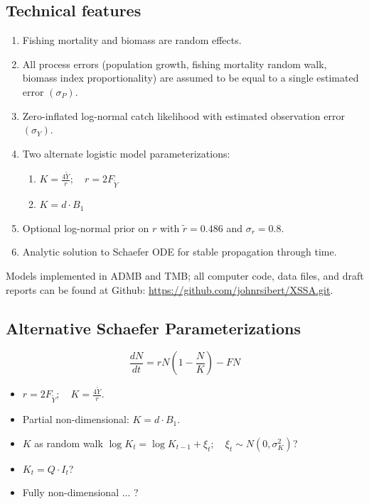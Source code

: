 \documentclass[letterpaper,KOMA,landscape,titlepage]{powersem}
\newcommand\MSY{\widetilde{Y}}
\newcommand\Fmsy{F_{\MSY}}
\begin{document}
\begin{slide}\section{Technical features}
\begin{enumerate}
\item Fishing mortality and biomass are random effects.
\item All process errors (population growth, fishing
mortality random walk, biomass index proportionality) are assumed
to be equal to a single estimated error $(\sigma_P)$.
\item Zero-inflated log-normal catch likelihood with estimated
observation error $(\sigma_Y)$.
\item Two alternate logistic model parameterizations:
\begin{enumerate}
\item $K = \frac{4\MSY}{r};\quad r = 2\Fmsy$
\item $K = d\cdot B_1$
\end{enumerate}
\item Optional log-normal prior on $r$ with 
$\tilde{r} = 0.486$ and $\sigma_r = 0.8$.
\item Analytic solution to Schaefer ODE for stable propagation
through time.
\end{enumerate}
\vfill
\par Models implemented in ADMB and TMB;
all computer code, data files, and draft reports 
can be found at Github:
\url{https://github.com/johnrsibert/XSSA.git}.
\end{slide}

\begin{slide}\section{Alternative Schaefer Parameterizations}
\begin{center}
$$\frac{dN}{dt} = rN(1-\frac{N}{K}) - FN$$
\end{center}
\begin{itemize}
\item $r=2F_{\MSY};\quad K=\frac{4\MSY}{r}$.
\item Partial non-dimensional: $K=d\cdot B_1$.
\item $K$ as random walk $\log K_t = \log K_{t-1} + \xi_t;\quad \xi_t\sim
N(0,\sigma^2_K)$?
\item $K_t = Q\cdot I_t$?
\item Fully non-dimensional ... ?
\end{itemize}
\end{slide}
\end{document}
